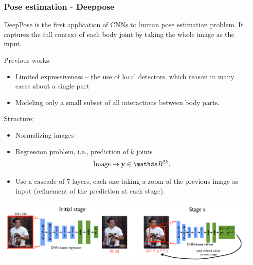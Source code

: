 \begin{frame}[allowframebreaks]
\frametitle{Pose estimation - Deeppose}


\bigskip

DeepPose  is the first application of CNNs to human pose estimation problem. It captures the full context of each body joint by taking the whole image as the input.

\bigskip

Previous works: 
\begin{itemize}
	\item Limited expressiveness – the use of local detectors, which
	reason in many cases about a single part
	\item Modeling only a small subset of all interactions
	between body parts.
\end{itemize}

\framebreak

Structure: 
\begin{itemize}
	\item Normalizing images
	\item Regression problem, i.e., prediction of $k$ joints
	$$
	\textrm{Image} \mapsto \textbf{y} \in \R^{2k}.
	$$
	\item Use a cascade of $7$ layers, each one taking a zoom of the previous image as input (refinement of the prediction at each stage).
\end{itemize}



\begin{center}
	\includegraphics[scale=0.6]{figs/Deeppose}
\end{center}

\framebreak


\end{frame}
